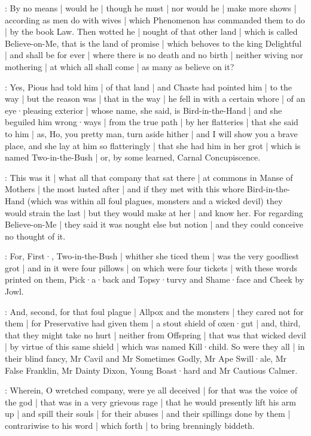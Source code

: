 :
By no means |
would he |
though he must |
nor would he |
make more shows |
according as men do with wives |
which Phenomenon has commanded them to do |
by the book Law.
Then wotted he |
nought of that other land |
which is called Believe-on-Me,
that is the land of promise |
which behoves to the king Delightful |
and shall be for ever |
where there is no death and no birth |
neither wiving nor mothering |
at which all shall come |
as many as believe on it?

:
Yes,
Pious had told him |
of that land |
and Chaste had pointed him |
to the way |
but the reason was |
that in the way |
he fell in with a certain whore |
of an eye·pleasing exterior |
whose name,
she said,
is Bird-in-the-Hand |
and she beguiled him wrong·ways |
from the true path |
by her flatteries |
that she said to him |
as,
Ho,
you pretty man,
turn aside hither |
and I will show you a brave place,
and she lay at him so flatteringly |
that she had him in her grot |
which is named Two-in-the-Bush |
or,
by some learned,
Carnal Concupiscence.


:
This was it |
what all that company that sat there |
at commons in Manse of Mothers |
the most lusted after |
and if they met with this whore Bird-in-the-Hand
(which was within all foul plagues,
monsters and a wicked devil)
they would strain the last |
but they would make at her |
and know her.
For regarding Believe-on-Me |
they said it was nought else but notion |
and they could conceive no thought of it.

:
For,
First·,
Two-in-the-Bush |
whither she ticed them |
was the very goodliest grot |
and in it were four pillows |
on which were four tickets |
with these words printed on them,
Pick·a·back and Topsy·turvy and Shame·face and Cheek by Jowl.

:
And,
second,
for that foul plague |
Allpox and the monsters |
they cared not for them |
for Preservative had given them |
a stout shield of oxen·gut |
and,
third,
that they might take no hurt |
neither from Offspring |
that was that wicked devil |
by virtue of this same shield |
which was named Kill·child.
So were they all |
in their blind fancy,
Mr Cavil and Mr Sometimes Godly,
Mr Ape Swill·ale,
Mr False Franklin,
Mr Dainty Dixon,
Young Boast·hard
and Mr Cautious Calmer.

:
Wherein,
O wretched company,
were ye all deceived |
for that was the voice of the god |
that was in a very grievous rage |
that he would presently lift his arm up |
and spill their souls |
for their abuses |
and their spillings done by them |
contrariwise to his word |
which forth |
to bring brenningly biddeth.

